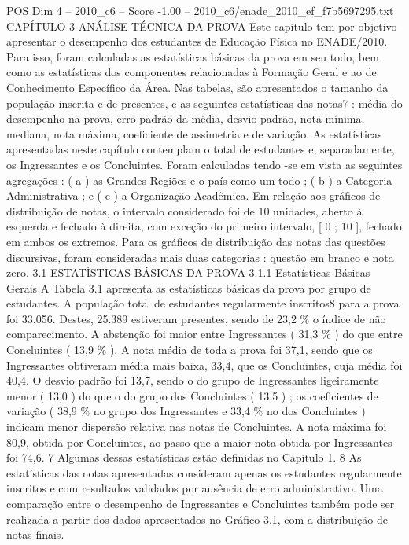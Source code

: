\begin{textsample}{POS Dim 4 – 2010\_c6 – Score -1.00 – 2010\_c6/enade\_2010\_ef\_f7b5697295.txt}  \label{ex:f4_pos_315}
CAPÍTULO 3 ANÁLISE TÉCNICA DA PROVA Este capítulo tem por objetivo apresentar o desempenho dos estudantes de Educação Física no ENADE/2010.
Para isso, foram calculadas as estatísticas básicas da prova em seu todo, bem como as estatísticas dos componentes relacionadas à Formação Geral e ao de Conhecimento Específico da Área.
Nas tabelas, são apresentados o tamanho da população inscrita e de presentes, e as seguintes estatísticas das notas7 : média do desempenho na prova, erro padrão da média, desvio padrão, nota mínima, mediana, nota máxima, coeficiente de assimetria e de variação.
As estatísticas apresentadas neste capítulo contemplam o total de estudantes e, separadamente, os Ingressantes e os Concluintes.
Foram calculadas tendo -se em vista as seguintes agregações : ( a ) as Grandes Regiões e o país como um todo ; ( b ) a Categoria Administrativa ; e ( c ) a Organização Acadêmica.
Em relação aos gráficos de distribuição de notas, o intervalo considerado foi de 10 unidades, aberto à esquerda e fechado à direita, com exceção do primeiro intervalo, [ 0 ; 10 ], fechado em ambos os extremos.
Para os gráficos de distribuição das notas das questões discursivas, foram consideradas mais duas categorias : questão em branco e nota zero. 3.1 ESTATÍSTICAS BÁSICAS DA PROVA 3.1.1 Estatísticas Básicas Gerais A Tabela 3.1 apresenta as estatísticas básicas da prova por grupo de estudantes.
A população total de estudantes regularmente inscritos8 para a prova foi 33.056.
Destes, 25.389 estiveram presentes, sendo de 23,2 \% o índice de não comparecimento.
A abstenção foi maior entre Ingressantes ( 31,3 \% ) do que entre Concluintes ( 13,9 \% ).
A nota média de toda a prova foi 37,1, sendo que os Ingressantes obtiveram média mais baixa, 33,4, que os Concluintes, cuja média foi 40,4.
O desvio padrão foi 13,7, sendo o do grupo de Ingressantes ligeiramente menor ( 13,0 ) do que o do grupo dos Concluintes ( 13,5 ) ; os coeficientes de variação ( 38,9 \% no grupo dos Ingressantes e 33,4 \% no dos Concluintes ) indicam menor dispersão relativa nas notas de Concluintes.
A nota máxima foi 80,9, obtida por Concluintes, ao passo que a maior nota obtida por Ingressantes foi 74,6. 7 Algumas dessas estatísticas estão definidas no Capítulo 1. 8 As estatísticas das notas apresentadas consideram apenas os estudantes regularmente inscritos e com resultados validados por ausência de erro administrativo.
Uma comparação entre o desempenho de Ingressantes e Concluintes também pode ser realizada a partir dos dados apresentados no Gráfico 3.1, com a distribuição de notas finais.

\end{textsample}
